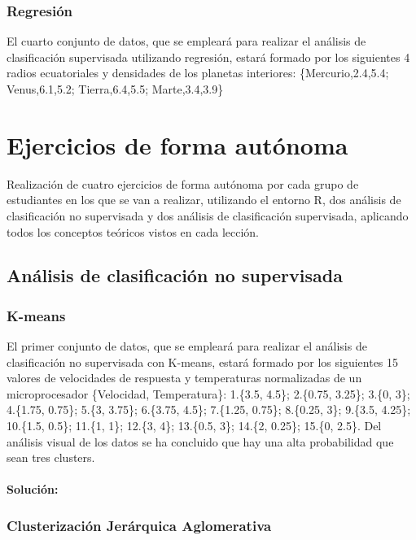 \documentclass[a4paper, 12pt]{article}
\begin{document}
	
	\subsubsection{Regresión}
	
	El cuarto conjunto de datos, que se empleará para realizar el análisis de clasificación supervisada utilizando regresión, estará formado por los siguientes 4 radios ecuatoriales y densidades de los planetas interiores: \{Mercurio,2.4,5.4; Venus,6.1,5.2; Tierra,6.4,5.5; Marte,3.4,3.9\}
	
	
	\newpage
	
	\section{Ejercicios de forma autónoma}
	
	Realización de cuatro ejercicios de forma autónoma por cada grupo de estudiantes en los que se van a realizar, utilizando el entorno R, dos análisis de clasificación no supervisada y dos análisis de clasificación supervisada, aplicando todos los conceptos teóricos vistos en cada lección.
	
	\subsection{Análisis de clasificación no supervisada}
	
	\subsubsection{K-means}
	
	El primer conjunto de datos, que se empleará para realizar el análisis de clasificación no supervisada con K-means, estará formado por los siguientes 15 valores de velocidades de respuesta y temperaturas normalizadas de un microprocesador \{Velocidad, Temperatura\}: 1.\{3.5, 4.5\}; 2.\{0.75, 3.25\}; 3.\{0, 3\}; 4.\{1.75, 0.75\}; 5.\{3, 3.75\}; 6.\{3.75, 4.5\}; 7.\{1.25, 0.75\}; 8.\{0.25, 3\}; 9.\{3.5, 4.25\}; 10.\{1.5, 0.5\}; 11.\{1, 1\}; 12.\{3, 4\}; 13.\{0.5, 3\}; 14.\{2, 0.25\}; 15.\{0, 2.5\}. Del análisis visual de los datos se ha concluido que hay una alta probabilidad que sean tres clusters.
	
	\paragraph{Solución:}
	
	
	\subsubsection{Clusterización Jerárquica Aglomerativa}
	
\end{document}
